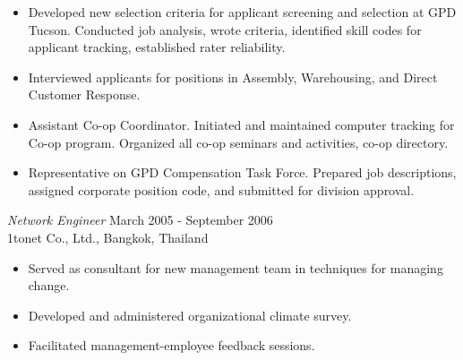 \documentclass{res}
\begin{document}
\begin{resume}
\begin{itemize} \itemsep -2pt %
   \item Developed  new selection criteria for applicant screening and 
    selection  at  GPD  Tucson.  Conducted  job  analysis,  wrote 
    criteria,  identified  skill  codes  for  applicant tracking, 
    established rater reliability. 
   \item Interviewed   applicants   for   positions    in    Assembly, 
    Warehousing, and Direct Customer Response. 
  \item Assistant   Co-op   Coordinator.   Initiated  and  maintained 
    computer tracking for  Co-op  program.  Organized  all  co-op 
    seminars and activities, co-op directory. 
   \item Representative  on  GPD Compensation Task Force. Prepared job 
    descriptions, assigned corporate position code, and submitted 
    for division approval. 
 \end{itemize}
 
{\sl Network Engineer} \hfill                  March 2005 - September 2006 \\
1tonet Co., Ltd., Bangkok, Thailand
  \begin{itemize} \itemsep -2pt
  \item Served  as  consultant  for new management team in techniques 
    for managing change. 
 \item  Developed and administered organizational climate survey. 
 \item  Facilitated management-employee feedback sessions. 
 \end{itemize}
                    
\vspace{0.2in} 

\end{resume}
\end{document}

